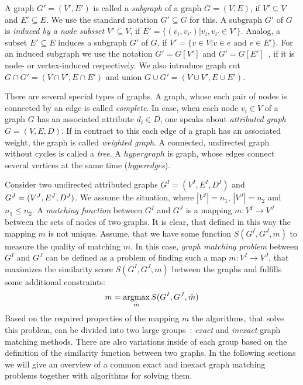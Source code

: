 A graph $G'=(V',E')$ is called a \emph{subgraph} of a graph $G=(V,E)$, if $V'\subseteq V$ and $E'\subseteq E$. We use the standard notation $G'\subseteq G$ for this. A subgraph $G'$ of $G$ is \emph{induced by a node subsset $V'\subseteq V$}, if $E'=\{(v_i, v_{i'})|v_i,v_{i'}\in V'\}$. Analog, a subset $E'\subseteq E$ induces a subgraph $G'$ of $G$, if $V'=\{v\in V|v\in e\text{ and }e\in E'\}$. For an induced subgraph we use the notation $G'=G[V']$ and $G'=G[E']$~\cite{Diestel2000}, if it is node- or vertex-induced respectively. We also introduce graph cut $G\cap G'=(V\cap V', E\cap E')$ and union $G\cup G'=(V\cup V', E\cup E')$.

There are several special types of graphs. A graph, whose each pair of nodes is connected by an edge is called \emph{complete}. In case, when each node $v_i\in V$ of a graph $G$ has an associated attribute $d_i\in D$, one speaks about \emph{attributed graph} $G=(V,E,D)$. If in contract to this each edge of a graph has an associated weight, the graph is called \emph{weighted graph}. A connected, undirected graph without cycles is called a \emph{tree}. A $hypergraph$ is graph, whose edges connect several vertices at the same time (\emph{hyperedges}).

Consider two undirected attributed graphs $G^I = (V^I, E^I, D^I)$ and $G^J = (V^J, E^J,\newline D^J)$. We assume the situation, where $|V^I|=n_1$, $|V^J|=n_2$ and $n_1\le n_2$. A \emph{matching function} between $G^I$ and $G^J$ is a mapping $m:V^I\rightarrow V^J$ between the sets of nodes of two graphs.
It is clear, that defined in this way the mapping $m$ is not unique. Assume, that we have some function $S(G^I, G^J, m)$ to measure the quality of matching $m$. In this case, \emph{graph matching problem} between $G^I$ and $G^J$ can be defined as a problem of finding such a map $m:V^I\rightarrow V^J$, that maximizes the similarity score $S(G^I, G^J, m)$ between the graphs and fulfills some additional constraints:
\begin{equation} \label{gGMP}
m = \mathop{\rm argmax}_{\hat{m}}S(G^I, G^J, \hat{m})
\end{equation}
Based on the required properties of the mapping $m$ the algorithms, that solve this problem, can be divided into two large groups~\cite{Conte2004}: \emph{exact} and \emph{inexact} graph matching methods. There are also variations inside of each group based on the definition of the similarity function between two graphs. In the following sections we will give an overview of a common exact and inexact graph matching problems together with algorithms for solving them.
